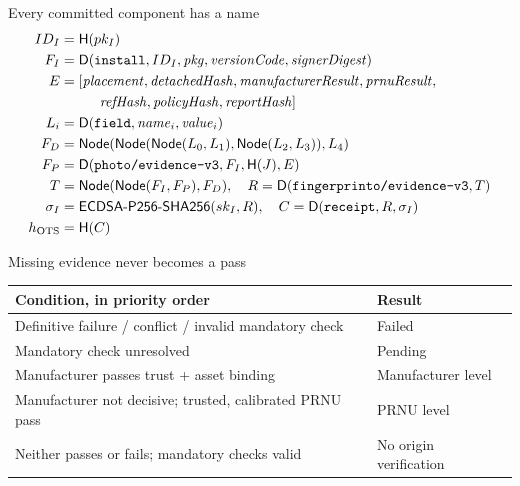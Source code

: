 \begin{frame}[noframenumbering]{Every committed component has a name}
{\small\setlength{\jot}{0pt}\setlength{\abovedisplayskip}{4pt}\setlength{\belowdisplayskip}{4pt}\begin{align*}
ID_I &= \mathsf H(pk_I)\\
F_I &= \mathsf D(\texttt{install},ID_I,\mathit{pkg},\mathit{versionCode},\mathit{signerDigest})\\
E &= [\mathit{placement},\mathit{detachedHash},\mathit{manufacturerResult},\mathit{prnuResult},\\
&\hspace{1cm}\mathit{refHash},\mathit{policyHash},\mathit{reportHash}]\\
L_i &= \mathsf D(\texttt{field},\mathit{name}_i,\mathit{value}_i)\\
F_D &= \mathsf{Node}(\mathsf{Node}(\mathsf{Node}(L_0,L_1),\mathsf{Node}(L_2,L_3)),L_4)\\
F_P &= \mathsf D(\texttt{photo/evidence-v3},F_I,\mathsf H(J),E)\\
T &= \mathsf{Node}(\mathsf{Node}(F_I,F_P),F_D),\quad R=\mathsf D(\texttt{fingerprinto/evidence-v3},T)\\
\sigma_I &= \mathsf{ECDSA\text{-}P256\text{-}SHA256}(sk_I,R),\quad C=\mathsf D(\texttt{receipt},R,\sigma_I)\\
h_{\rm OTS} &= \mathsf H(C)
\end{align*}}
\vspace{0.2cm}
\vfill
{}
\end{frame}

\begin{frame}[noframenumbering]{Missing evidence never becomes a pass}
\renewcommand{\arraystretch}{1.5}
\begin{tabular}{@{}>{\raggedright\arraybackslash}p{8.6cm}>{\raggedright\arraybackslash}p{4.1cm}@{}}
\textbf{Condition, in priority order} & \textbf{Result}\\\hline
Definitive failure / conflict / invalid mandatory check & Failed\\
Mandatory check unresolved & Pending\\
Manufacturer passes trust + asset binding & Manufacturer level\\
Manufacturer not decisive; trusted, calibrated PRNU pass & PRNU level\\
Neither passes or fails; mandatory checks valid & No origin verification\\
\end{tabular}\par
\vspace{0.3cm}
\end{frame}

